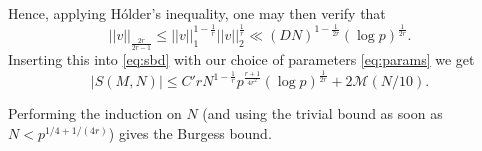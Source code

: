 \documentclass[a4paper,11pt,twoside]{amsart}
\begin{document}
Hence, applying H\'{o}lder's inequality, one may then verify that
\[
||v||_\frac{2r}{2r-1} \leq ||v||_1^{1-\frac{1}{r}} ||v||_2^{\frac{1}{r}} \ll (DN)^{1-\frac{1}{2r}} (\log p)^{\frac{1}{2r}}.
\]
Inserting this into \eqref{eq:sbd} with our choice of parameters \eqref{eq:params} we get
\[
|S(M,N)| \leq C' r N^{1-\frac{1}{r}} p^{\frac{r+1}{4r^2}} (\log p)^{\frac{1}{2r}}+ 2 \mathcal{M}(N/10).
\]

Performing the induction on $N$ (and using the trivial bound as soon as $N < p^{1/4+1/(4r)}$) gives the Burgess bound.

 

\end{document}
